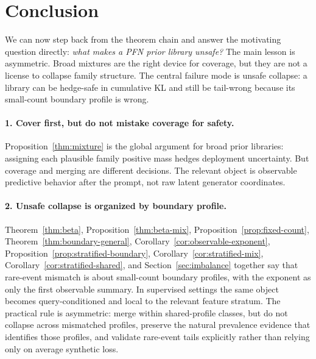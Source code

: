 \documentclass{article}
\theoremstyle{definition}
\theoremstyle{remark}
\begin{document}
\section{Conclusion}

We can now step back from the theorem chain and answer the motivating question directly: \emph{what makes a PFN prior library unsafe?} The main lesson is asymmetric. Broad mixtures are the right device for coverage, but they are not a license to collapse family structure. The central failure mode is unsafe collapse: a library can be hedge-safe in cumulative KL and still be tail-wrong because its small-count boundary profile is wrong.

\paragraph{1. Cover first, but do not mistake coverage for safety.}
Proposition~\ref{thm:mixture} is the global argument for broad prior libraries: assigning each plausible family positive mass hedges deployment uncertainty. But coverage and merging are different decisions. The relevant object is observable predictive behavior after the prompt, not raw latent generator coordinates.

\paragraph{2. Unsafe collapse is organized by boundary profile.}
Theorem~\ref{thm:beta}, Proposition~\ref{thm:beta-mix}, Proposition~\ref{prop:fixed-count}, Theorem~\ref{thm:boundary-general}, Corollary~\ref{cor:observable-exponent}, Proposition~\ref{prop:stratified-boundary}, Corollary~\ref{cor:stratified-mix}, Corollary~\ref{cor:stratified-shared}, and Section~\ref{sec:imbalance} together say that rare-event mismatch is about small-count boundary profiles, with the exponent as only the first observable summary. In supervised settings the same object becomes query-conditioned and local to the relevant feature stratum. The practical rule is asymmetric: merge within shared-profile classes, but do not collapse across mismatched profiles, preserve the natural prevalence evidence that identifies those profiles, and validate rare-event tails explicitly rather than relying only on average synthetic loss.
\end{document}
